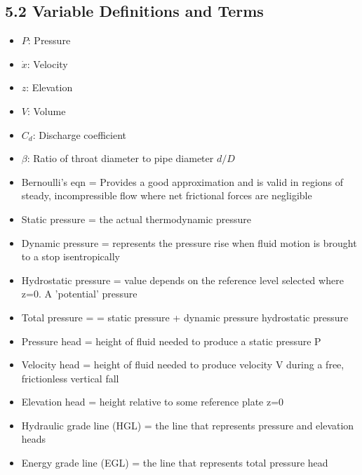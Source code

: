 \subsection*{5.2 Variable Definitions and Terms}
\begin{itemize}
    \item $P$: Pressure
    \item $\dot{x}$: Velocity
    \item $z$: Elevation
    \item $V$: Volume
    \item $C_d$: Discharge coefficient
    \item $\beta$: Ratio of throat diameter to pipe diameter $d/D$
    \item Bernoulli's eqn =  Provides a good approximation and is valid in regions of steady, incompressible flow where net frictional forces are negligible
    \item Static pressure = the actual thermodynamic pressure
    \item Dynamic pressure = represents the pressure rise when fluid motion is brought to a stop isentropically
    \item Hydrostatic pressure = value depends on the reference level selected where z=0. A 'potential' pressure
    \item Total pressure = = static pressure + dynamic pressure hydrostatic pressure
    \item Pressure head = height of fluid needed to produce a static pressure P
    \item Velocity head = height of fluid needed to produce velocity V during a free, frictionless vertical fall
    \item Elevation head = height relative to some reference plate z=0
    \item Hydraulic grade line (HGL) = the line that represents pressure and elevation heads
    \item Energy grade line (EGL) = the line that represents total pressure head
\end{itemize}
